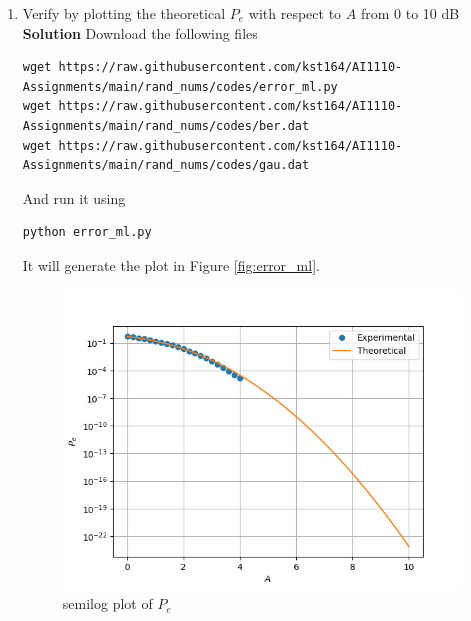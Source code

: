 \documentclass[journal, 12pt, twocolumn]{IEEEtran}
\begin{document}
\begin{enumerate}[label=\arabic{section}.\arabic*]
    \item
        Verify by plotting the theoretical $P_e$ with respect to $A$ from 0 to 10 dB
        \\
        \textbf{Solution} Download the following files
        \begin{lstlisting}
wget https://raw.githubusercontent.com/kst164/AI1110-Assignments/main/rand_nums/codes/error_ml.py
wget https://raw.githubusercontent.com/kst164/AI1110-Assignments/main/rand_nums/codes/ber.dat
wget https://raw.githubusercontent.com/kst164/AI1110-Assignments/main/rand_nums/codes/gau.dat
        \end{lstlisting}
        And run it using
        \begin{lstlisting}
python error_ml.py
        \end{lstlisting}
        It will generate the plot in Figure \eqref{fig:error_ml}.
        \begin{figure}[!ht]
            \includegraphics[width=\columnwidth]{figs/error_ml.png}
            \caption{semilog plot of $P_e$}
            \label{fig:error_ml}
        \end{figure}


\end{enumerate}
\end{document}
